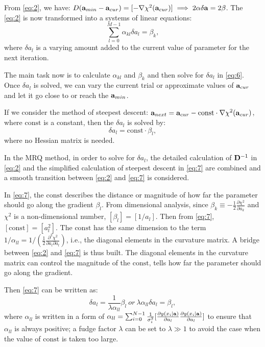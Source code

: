 From \ref{eq:2}, we have: $D({\bf a}_{min}-{\bf a}_{cur}) = [-\nabla\chi^2({\bf a}_{cur})]\implies 2{\bf\alpha\delta a}= 2{\bf\beta}$. The \ref{eq:2} is now transformed into a systems of linear equations:
\begin{equation}\label{eq:6}
\sum_{l=0}^{M-1}\alpha_{kl}\delta a_l = \beta_k,
\end{equation} where $\delta a_l$ is 
a varying amount added to the current value of parameter for the next iteration. 

The main task now is to calculate $\alpha_{kl}$ and $\beta_k$ and then solve for $\delta a_l$ in \ref{eq:6}. Once $\delta a_l$ is solved, we can vary the current trial or approximate values of ${\bf a}_{cur}$ and let it go close to or reach the ${\bf a}_{min}$.

If we consider the method of steepest descent: ${\bf a}_{next}={\bf a}_{cur}-\mathrm{const}\cdot\nabla\chi^2({\bf a}_{cur})$, where $\mathrm{const}$ is a constant, then the $\delta a_l$ is solved by: 
\begin{equation}\label{eq:7}
\delta a_l=\mathrm{const}\cdot \beta_l, 
\end{equation}
where no Hessian matrix is needed.

In the MRQ method, in order to solve for $\delta a_l$, the detailed calculation of ${\bf D}^{-1}$ in \ref{eq:2} and the simplified calculation of steepest descent in \ref{eq:7} are combined and a smooth transition between \ref{eq:2} and \ref{eq:7} is considered.

In \ref{eq:7}, the $\mathrm{const}$ describes the distance or magnitude of how far the parameter should go along the gradient $\beta_l$. From dimensional analysis, since $\beta_k\equiv-\frac{1}{2}\frac{\partial\chi^2}{\partial a_k}$ and $\chi^2$ is a non-dimensional number, $[\beta_l]=[1/a_l]$. Then from \ref{eq:7}, $[\mathrm{const}]=[a^2_l]$. The $\mathrm{const}$ has the same dimension to the term $1/\alpha_{ll}= 1/(\frac{1}{2}\frac{\partial^2\chi^2}{\partial a_l\partial a_l})$, i.e., the diagonal elements in the curvature matrix. A bridge between \ref{eq:2} and \ref{eq:7} is thus built. The diagonal elements in the curvature matrix can control the magnitude of the $\mathrm{const}$, tells how far the parameter should go along the gradient. 

Then \ref{eq:7} can be written as:
\begin{equation}\label{eq:8}
\delta a_l = \frac{1}{\lambda \alpha_{ll}}\beta_l~or~\lambda \alpha_{ll}\delta a_l = \beta_l, 
\end{equation} 
where $\alpha_{ll}$ is written in a form of $\alpha_{ll}=\sum_{i=0}^{N-1}\frac{1}{\sigma^2_i}[\frac{\partial y(x_i|{\bf a})}{\partial a_l} \frac{\partial y(x_i|{\bf a})}{\partial a_l}]$ to ensure that $\alpha_{ll}$ is always positive; a fudge factor $\lambda$ can be set to $\lambda \gg 1$ to avoid the case when the value of $\mathrm{const}$ is taken too large.

